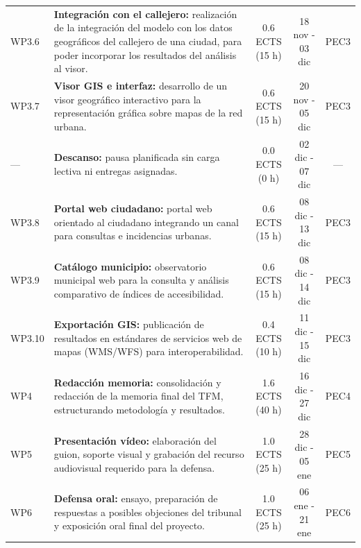 \begin{table}[H]
\begin{tabularx}{\textwidth}{l X c c c}
    WP3.6 & \textbf{Integración con el callejero:} realización de la integración del modelo con los datos geográficos del callejero de una ciudad, para poder incorporar los resultados del análisis al visor. & \makecell{0.6 ECTS \\ (15 h)} & 18 nov - 03 dic & PEC3 \\
    WP3.7 & \textbf{Visor GIS e interfaz:} desarrollo de un visor geográfico interactivo para la representación gráfica sobre mapas de la red urbana. & \makecell{0.6 ECTS \\ (15 h)} & 20 nov - 05 dic & PEC3 \\
    \rowcolor{gray!15}
    --- & \textbf{Descanso:} pausa planificada sin carga lectiva ni entregas asignadas. & \makecell{0.0 ECTS \\ (0 h)} & 02 dic - 07 dic & --- \\
    WP3.8 & \textbf{Portal web ciudadano:} portal web orientado al ciudadano integrando un canal para consultas e incidencias urbanas. & \makecell{0.6 ECTS \\ (15 h)} & 08 dic - 13 dic & PEC3 \\
    WP3.9 & \textbf{Catálogo municipio:} observatorio municipal web para la consulta y análisis comparativo de índices de accesibilidad. & \makecell{0.6 ECTS \\ (15 h)} & 08 dic - 14 dic & PEC3 \\
    WP3.10 & \textbf{Exportación GIS:} publicación de resultados en estándares de servicios web de mapas (WMS/WFS) para interoperabilidad. & \makecell{0.4 ECTS \\ (10 h)} & 11 dic - 15 dic & PEC3 \\
    \midrule
    WP4 & \textbf{Redacción memoria:} consolidación y redacción de la memoria final del TFM, estructurando metodología y resultados. & \makecell{1.6 ECTS \\ (40 h)} & 16 dic - 27 dic & PEC4 \\
    \midrule
    WP5 & \textbf{Presentación vídeo:} elaboración del guion, soporte visual y grabación del recurso audiovisual requerido para la defensa. & \makecell{1.0 ECTS \\ (25 h)} & 28 dic - 05 ene & PEC5 \\
    \midrule
    WP6 & \textbf{Defensa oral:} ensayo, preparación de respuestas a posibles objeciones del tribunal y exposición oral final del proyecto. & \makecell{1.0 ECTS \\ (25 h)} & 06 ene - 21 ene & PEC6 \\
    \bottomrule
  \end{tabularx}
\end{table}

